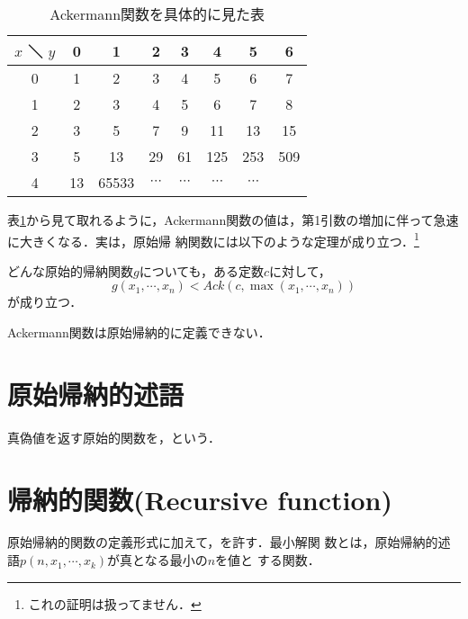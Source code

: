 \begin{table}
 \caption{Ackermann関数を具体的に見た表}
 \begin{center}
  \begin{tabular}{c|c|c|c|c|c|c|c}
   \hline
   $x$ ＼ $y$ & 0 & 1 & 2 & 3&4&5&6 \\
    \hline \hline
   0&1&2&3&4&5&6&7\\ \hline
   1&2&3&4&5&6&7&8\\ \hline
   2&3&5&7&9&11&13&15\\ \hline
   3&5&13&29&61&125&253&509\\ \hline
   4&13&65533&$\cdots$&$\cdots$&$\cdots$&$\cdots$&\\ \hline
  \end{tabular}
  \label{tb:06Ackermann関数を具体的に見た表}
 \end{center}
\end{table}
表\ref{tb:06Ackermann関数を具体的に見た表}から見て取れるように，Ackermann関数の値は，第1引数の増加に伴って急速に大きくなる．実は，原始帰
納関数には以下のような定理が成り立つ．\footnote{これの証明は扱ってません．}
\begin{mytheorem}
どんな原始的帰納関数$g$についても，ある定数$c$に対して，
\[
 g(x_1, \cdots , x_n) < Ack(c, \max (x_1, \cdots , x_n))
\]
が成り立つ．
\end{mytheorem}
\therefore Ackermann関数は原始帰納的に定義できない．

\section{原始帰納的述語}
真偽値を返す原始的関数を，という．

\section{帰納的関数(Recursive function)}
原始帰納的関数の定義形式に加えて，を許す．最小解関
数とは，原始帰納的述語$p(n, x_1, \cdots , x_k)$が真となる最小の$n$を値と
する関数．


